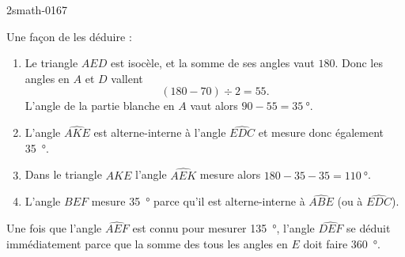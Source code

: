 \begin{corrige}{2smath-0167}
    \begin{center}

    \end{center}
    Une façon de les déduire :
    \begin{enumerate}
        \item
            Le triangle \( AED\) est isocèle, et la somme de ses angles vaut \( 180\). Donc les angles en \( A\) et \( D\) vallent
            \begin{equation}
                (180-70)\div 2=55.
            \end{equation}
            L'angle de la partie blanche en \( A\) vaut alors \( 90-55=\SI{35}{\degree}\).
        \item
            L'angle \( \widehat{AKE}\) est alterne-interne à l'angle \( \widehat{EDC}\) et mesure donc également \SI{35}{\degree}.
        \item
            Dans le triangle \( AKE\) l'angle \( \widehat{AEK}\) mesure alors \( 180-35-35=\SI{110}{\degree}\).
        \item
            L'angle \( \widehat{BEF}\) mesure \SI{35}{\degree} parce qu'il est alterne-interne à \( \widehat{ABE}\) (ou à $\widehat{EDC}$).
    \end{enumerate}
    Une fois que l'angle \( \widehat{AEF}\) est connu pour mesurer \SI{135}{\degree}, l'angle $\widehat{DEF}$ se déduit immédiatement parce que la somme des tous les angles en \( E\) doit faire \SI{360}{\degree}.

\end{corrige}
